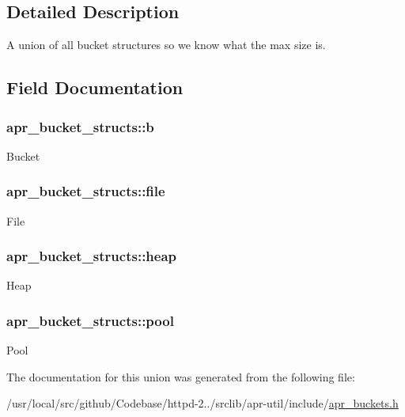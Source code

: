 \subsection{Detailed Description}
A union of all bucket structures so we know what the max size is. 

\subsection{Field Documentation}
\subsubsection[{\texorpdfstring{b}{b}}]{ apr\+\_\+bucket\+\_\+structs\+::b}\hypertarget{unionapr__bucket__structs_a840c42a20727de2e4534ca05f1f6c990}{}\label{unionapr__bucket__structs_a840c42a20727de2e4534ca05f1f6c990}
Bucket 
\subsubsection[{\texorpdfstring{file}{file}}]{ apr\+\_\+bucket\+\_\+structs\+::file}\hypertarget{unionapr__bucket__structs_ab339255acdf750133759a0d67b3f2e30}{}\label{unionapr__bucket__structs_ab339255acdf750133759a0d67b3f2e30}
File 
\subsubsection[{\texorpdfstring{heap}{heap}}]{ apr\+\_\+bucket\+\_\+structs\+::heap}\hypertarget{unionapr__bucket__structs_a5335dc82d8250e511a9c55e5fea97141}{}\label{unionapr__bucket__structs_a5335dc82d8250e511a9c55e5fea97141}
Heap 
\subsubsection[{\texorpdfstring{pool}{pool}}]{ apr\+\_\+bucket\+\_\+structs\+::pool}\hypertarget{unionapr__bucket__structs_ab926fe2af7c1780c03bf1669766db4a1}{}\label{unionapr__bucket__structs_ab926fe2af7c1780c03bf1669766db4a1}
Pool 

The documentation for this union was generated from the following file\+:\begin{DoxyCompactItemize}
\item 
/usr/local/src/github/\+Codebase/httpd-\/2../srclib/apr-\/util/include/\hyperlink{apr__buckets_8h}{apr\+\_\+buckets.\+h}\end{DoxyCompactItemize}
